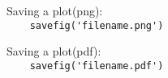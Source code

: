 Saving a plot(png):\\
{\ex \lstinline|    savefig('filename.png')|}

Saving a plot(pdf):\\
{\ex \lstinline|    savefig('filename.pdf')|}

